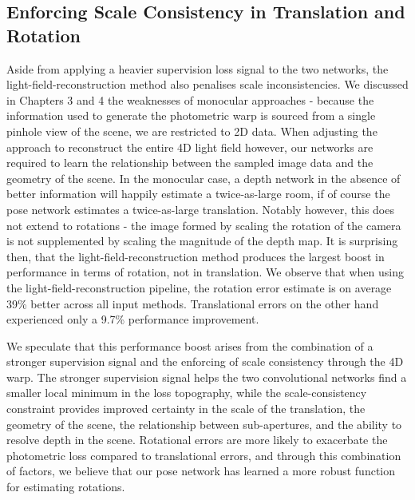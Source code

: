 \subsection{Enforcing Scale Consistency in Translation and Rotation}
Aside from applying a heavier supervision loss signal to the two networks, the light-field-reconstruction method also penalises scale inconsistencies. We discussed in Chapters 3 and 4 the weaknesses of monocular approaches - because the information used to generate the photometric warp is sourced from a single pinhole view of the scene, we are restricted to 2D data. When adjusting the approach to reconstruct the entire 4D light field however, our networks are required to learn the relationship between the sampled image data and the geometry of the scene. In the monocular case, a depth network in the absence of better information will happily estimate a twice-as-large room, if of course the pose network estimates a twice-as-large translation. Notably however, this does not extend to rotations - the image formed by scaling the rotation of the camera is not supplemented by scaling the magnitude of the depth map. It is surprising then, that the light-field-reconstruction method produces the largest boost in performance in terms of rotation, not in translation. We observe that when using the light-field-reconstruction pipeline, the rotation error estimate is on average 39\% better across all input methods. Translational errors on the other hand experienced only a 9.7\% performance improvement.

We speculate that this performance boost arises from the combination of a stronger supervision signal and the enforcing of scale consistency through the 4D warp. The stronger supervision signal helps the two convolutional networks find a smaller local minimum in the loss topography, while the scale-consistency constraint provides improved certainty in the scale of the translation, the geometry of the scene, the relationship between sub-apertures, and the ability to resolve depth in the scene. Rotational errors are more likely to exacerbate the photometric loss compared to translational errors, and through this combination of factors, we believe that our pose network has learned a more robust function for estimating rotations. 

